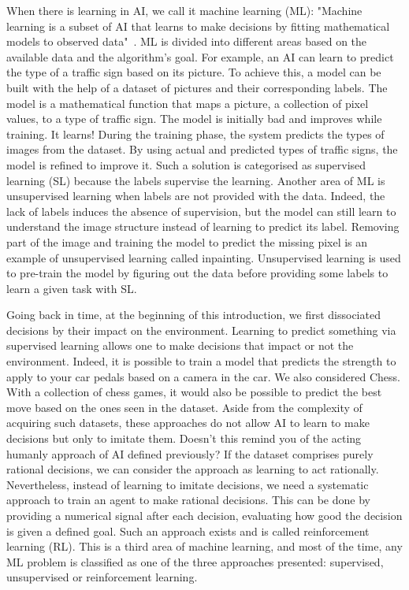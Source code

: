 When there is learning in AI, we call it machine learning (ML): "Machine learning is a subset of AI that learns to make decisions by fitting mathematical models to observed data"~\citep{prince2023understanding}.
ML is divided into different areas based on the available data and the algorithm's goal.
For example, an AI can learn to predict the type of a traffic sign based on its picture.
To achieve this, a model can be built with the help of a dataset of pictures and their corresponding labels.
The model is a mathematical function that maps a picture, a collection of pixel values, to a type of traffic sign.
The model is initially bad and improves while training. 
It learns!
During the training phase, the system predicts the types of images from the dataset.
By using actual and predicted types of traffic signs, the model is refined to improve it.
Such a solution is categorised as supervised learning (SL) because the labels supervise the learning.
Another area of ML is unsupervised learning when labels are not provided with the data.
Indeed, the lack of labels induces the absence of supervision, but the model can still learn to understand the image structure instead of learning to predict its label.
Removing part of the image and training the model to predict the missing pixel is an example of unsupervised learning called inpainting.
Unsupervised learning is used to pre-train the model by figuring out the data before providing some labels to learn a given task with SL.

Going back in time, at the beginning of this introduction, we first dissociated decisions by their impact on the environment.
Learning to predict something via supervised learning allows one to make decisions that impact or not the environment.
Indeed, it is possible to train a model that predicts the strength to apply to your car pedals based on a camera in the car.
We also considered Chess.
With a collection of chess games, it would also be possible to predict the best move based on the ones seen in the dataset.
Aside from the complexity of acquiring such datasets, these approaches do not allow AI to learn to make decisions but only to imitate them.
Doesn't this remind you of the acting humanly approach of AI defined previously?
If the dataset comprises purely rational decisions, we can consider the approach as learning to act rationally.
Nevertheless, instead of learning to imitate decisions, we need a systematic approach to train an agent to make rational decisions.
This can be done by providing a numerical signal after each decision, evaluating how good the decision is given a defined goal.
Such an approach exists and is called reinforcement learning (RL).
This is a third area of machine learning, and most of the time, any ML problem is classified as one of the three approaches presented: supervised, unsupervised or reinforcement learning.

